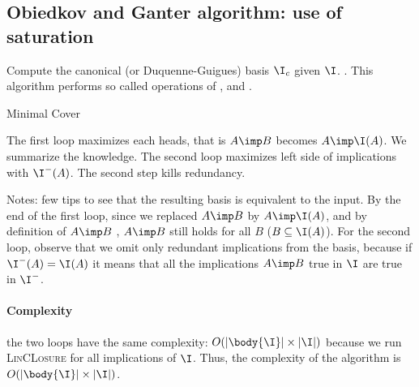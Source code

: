\subsection{Obiedkov and Ganter algorithm: use of saturation}

Compute the canonical (or Duquenne-Guigues) basis $\I_c$ given $\I$. 
\cite{guigues_familles_1986, b._ganter_conceptual_2016}. This algorithm performs
so called operations of ,  and
.

\vspace{1.2em}

\begin{algorithm}[H]

\BlankLine
\BlankLine



\caption{Minimal Cover}	
\label{alg:Obiedkov-MinCover}
\end{algorithm}

\vspace{1.2em}

\noindent The first loop maximizes each heads, that is $A \imp B$ becomes $A 
\imp \I(A)$. We summarize the knowledge. The second loop maximizes left side
of implications with $\I^{-}(A)$. The second step kills redundancy.

\vspace{1.2em}

\noindent Notes: few tips to see that the resulting basis is equivalent to the 
input. By the end of the first loop, since we replaced $A \imp B$ by $A \imp 
\I(A)$, and by definition of $A \imp B$ , $A \imp B$ still holds for all $B$
($B \subseteq \I(A)$). For the second loop, observe that we omit only redundant
implications from the basis, because if $\I^{-}(A) = \I(A)$ it means that all
the implications $A \imp B$ true in $\I$ are true in $\I^{-}$. 

\paragraph{Complexity} the two loops have the same complexity: $O(|\body{\I}| 
\times |\I|)$ because we run \textsc{LinCLosure} for all implications of $\I$.
Thus, the complexity of the algorithm is $O(|\body{\I}| \times |\I|)$.